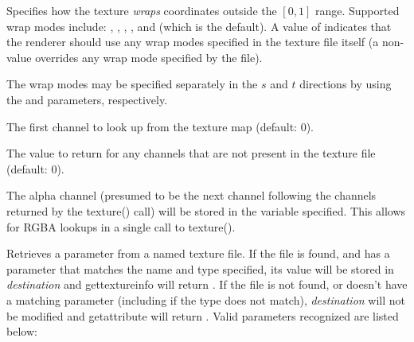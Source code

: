 \documentclass[11pt,letterpaper]{book}
\begin{document}
\vspace{12pt}

Specifies how the texture \emph{wraps} coordinates outside the $[0,1]$
range.  Supported wrap modes include: , ,
, , and  (which is the default).  A
value of  indicates that the renderer should use any wrap
modes specified in the texture file itself (a non- value
overrides any wrap mode specified by the file).

The wrap modes may be specified separately in the $s$ and $t$ directions
by using the  and  parameters, respectively.
\apiend
\vspace{-16pt}

\vspace{12pt}
The first channel to look up from the texture map (default: 0).
\apiend
\vspace{-16pt}

\vspace{12pt}
The value to return for any channels that are not present in the texture
file (default: 0).
\apiend
\vspace{-16pt}

\vspace{12pt}
The alpha channel (presumed to be the next channel following the
channels returned by the {\cf texture()} call) will be stored in the
variable specified.  This allows for RGBA lookups in a single call to
{\cf texture()}.
\apiend
\vspace{-16pt}

\apiend




Retrieves a parameter from a named texture file.  If the file is found,
and has a parameter that matches the name and type specified, its value
will be stored in \emph{destination} and {\cf gettextureinfo} will
return {}.  If the file is not found, or doesn't have a matching
parameter (including if the type does not match), \emph{destination}
will not be modified and {\cf getattribute} will return {}.  Valid
parameters recognized are listed below:
\end{document}
